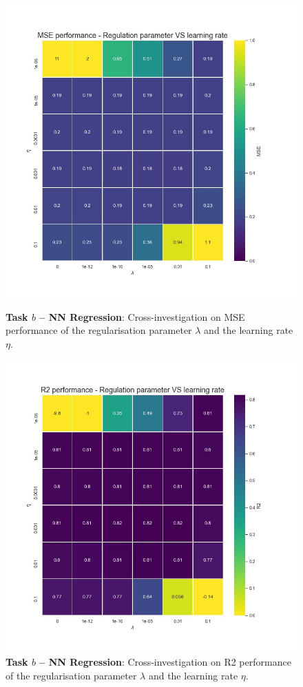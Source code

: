 \documentclass[english,notitlepage,reprint,nofootinbib]{revtex4-1}  %
\begin{document}
\begin{figure}[h]
    \centering 
    \includegraphics[scale=0.3]{NN/RegrNN_lmd_eta_MSE.jpg}
    \caption{\textbf{Task $b$ – NN Regression}: Cross-investigation on MSE performance of the regularisation parameter $\lambda$ and the learning rate $\eta$.}
    \label{fig:mse_nn_regr}
    \centering 
    \includegraphics[scale=0.3]{NN/RegrNN_lmd_eta_R2.jpg}
    \caption{\textbf{Task $b$ – NN Regression}: Cross-investigation on R2 performance of the regularisation parameter $\lambda$ and the learning rate $\eta$.}
    \label{fig:r2_nn_regr}
\end{figure}
\end{document}
